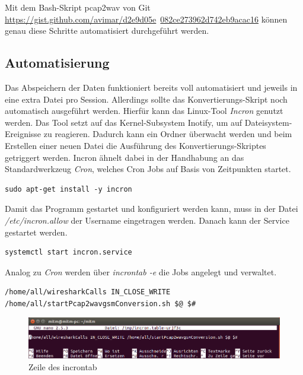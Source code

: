 Mit dem Bash-Skript pcap2wav von Git \url{https://gist.github.com/avimar/d2e9d05e}\
\url{082ce273962d742eb9acac16} können genau diese Schritte automatisiert durchgeführt werden.


\subsection{Automatisierung}\label{automatisierung}

Das Abspeichern der Daten funktioniert bereits voll automatisiert und jeweils in eine extra Datei pro Session. Allerdings sollte das Konvertierungs-Skript noch automatisch ausgeführt werden. Hierfür kann das Linux-Tool \textit{Incron} genutzt werden. Das Tool setzt auf das Kernel-Subsystem Inotify, um auf Dateisystem-Ereignisse zu reagieren. Dadurch kann ein Ordner überwacht werden und beim Erstellen einer neuen Datei die Ausführung des Konvertierungs-Skriptes getriggert werden. Incron ähnelt dabei in der Handhabung an das Standardwerkzeug \textit{Cron}, welches Cron Jobs auf Basis von Zeitpunkten startet.


\begin{lstlisting}
sudo apt-get install -y incron
\end{lstlisting}

Damit das Programm gestartet und konfiguriert werden kann, muss in der Datei \textit{/etc/incron.allow} der Username eingetragen werden. Danach kann der Service gestartet werden.

\begin{lstlisting}
systemctl start incron.service
\end{lstlisting}

Analog zu \textit{Cron} werden über \textit{incrontab -e} die Jobs angelegt und verwaltet.
\begin{lstlisting}
/home/all/wiresharkCalls IN_CLOSE_WRITE /home/all/startPcap2wavgsmConversion.sh $@ $#
\end{lstlisting}


\begin{figure}[h] %
\centering
\includegraphics[width=15cm]{includes/incrontab}
\caption{Zeile des incrontab}
\label{fig:incrontab}
\end{figure}


